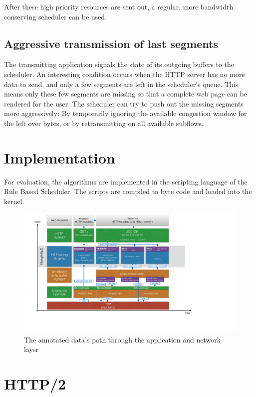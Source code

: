 \documentclass[article,type=bsc,colorback,accentcolor=tud9c]{tudthesis}
\begin{document}
After these high priority resources are sent out, a regular, more bandwidth conserving scheduler can be used.



\subsection{Aggressive transmission of last segments}
The transmitting application signals the state of its outgoing buffers to the scheduler. An interesting condition occurs when the HTTP server has no more data to send, and only a few segments are left in the scheduler's queue. This means only these few segments are missing so that a complete web page can be rendered for the user. The scheduler can try to push out the missing segments more aggressively: By temporarily ignoring the available congestion window for the left over bytes, or by retransmitting on all available subflows.


\section{Implementation}



For evaluation, the algorithms are implemented in the scripting language of the Rule Based Scheduler. 
The scripts are compiled to byte code and loaded into the kernel.

\begin{figure}[b]
\includegraphics[width=1\textwidth]{http2-awb-layers.pdf}
  \caption{The annotated data's path through the application and network layer}
\end{figure}

\section{HTTP/2}
\end{document}
